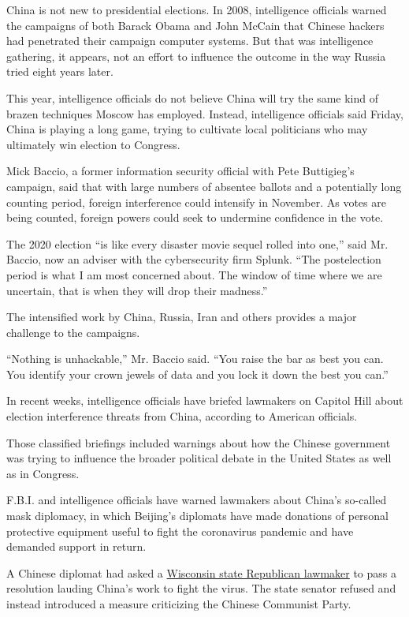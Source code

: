 China is not new to presidential elections. In 2008, intelligence
officials warned the campaigns of both Barack Obama and John McCain that
Chinese hackers had penetrated their campaign computer systems. But that
was intelligence gathering, it appears, not an effort to influence the
outcome in the way Russia tried eight years later.

This year, intelligence officials do not believe China will try the same
kind of brazen techniques Moscow has employed. Instead, intelligence
officials said Friday, China is playing a long game, trying to cultivate
local politicians who may ultimately win election to Congress.

Mick Baccio, a former information security official with Pete
Buttigieg's campaign, said that with large numbers of absentee ballots
and a potentially long counting period, foreign interference could
intensify in November. As votes are being counted, foreign powers could
seek to undermine confidence in the vote.

The 2020 election ``is like every disaster movie sequel rolled into
one,'' said Mr. Baccio, now an adviser with the cybersecurity firm
Splunk. ``The postelection period is what I am most concerned about. The
window of time where we are uncertain, that is when they will drop their
madness.''

The intensified work by China, Russia, Iran and others provides a major
challenge to the campaigns.

``Nothing is unhackable,'' Mr. Baccio said. ``You raise the bar as best
you can. You identify your crown jewels of data and you lock it down the
best you can.''

In recent weeks, intelligence officials have briefed lawmakers on
Capitol Hill about election interference threats from China, according
to American officials.

Those classified briefings included warnings about how the Chinese
government was trying to influence the broader political debate in the
United States as well as in Congress.

F.B.I. and intelligence officials have warned lawmakers about China's
so-called mask diplomacy, in which Beijing's diplomats have made
donations of personal protective equipment useful to fight the
coronavirus pandemic and have demanded support in return.

A Chinese diplomat had asked a
\href{https://www.nytimes.com/2020/04/14/us/politics/coronavirus-china-trump-donation.html}{Wisconsin
state Republican lawmaker} to pass a resolution lauding China's work to
fight the virus. The state senator refused and instead introduced a
measure criticizing the Chinese Communist Party.

